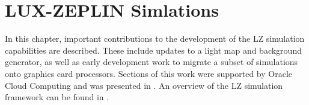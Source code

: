\chapter{LUX-ZEPLIN Simlations}
\par
In this chapter, important contributions to the development of the LZ simulation capabilities are described.
These include updates to a light map and background generator, as well as early development work to migrate a subset of simulations onto graphics card processors.
Sections of this work were supported by Oracle Cloud Computing and was presented in \cite{se_poster_2018,se_poster_2019_summerschool,se_poster_2019_bristol,SEriksen_IoP_2021_talk_ref}.
An overview of the LZ simulation framework can be found in \cite{lz_simulations_ref}.





